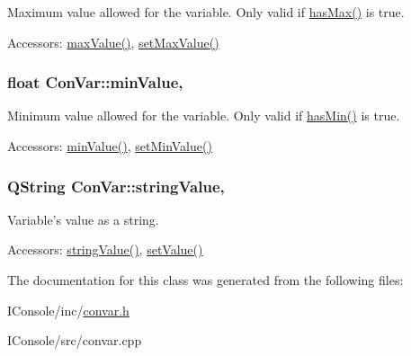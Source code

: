 Maximum value allowed for the variable. Only valid if \hyperlink{class_con_var_ab8a0883ab2a53b5ef20ea5673636ac01}{has\-Max()} is true. 

\begin{DoxyParagraph}{Accessors\-:}
\hyperlink{class_con_var_a1c7d02c351c6fe7e9eae58fa65ef0ae4}{max\-Value()}, \hyperlink{class_con_var_accd05b21f91b58de63554935dd51df7a}{set\-Max\-Value()} 
\end{DoxyParagraph}
\hypertarget{class_con_var_a6c1a10a39a46f2dcb03a0a2c8d840e7a}{
\subsubsection[{min\-Value}]{\setlength{\rightskip}{0pt plus 5cm}float Con\-Var\-::min\-Value\hspace{0.3cm}{\ttfamily [read]}, {\ttfamily [write]}}}\label{class_con_var_a6c1a10a39a46f2dcb03a0a2c8d840e7a}


Minimum value allowed for the variable. Only valid if \hyperlink{class_con_var_a047d4105baf54cb783602456e0947196}{has\-Min()} is true. 

\begin{DoxyParagraph}{Accessors\-:}
\hyperlink{class_con_var_a6c1a10a39a46f2dcb03a0a2c8d840e7a}{min\-Value()}, \hyperlink{class_con_var_a9379b560e93785245e941f35df3c56e5}{set\-Min\-Value()} 
\end{DoxyParagraph}
\hypertarget{class_con_var_aa4e598b04548ba7f296a2fbe77e13e4d}{
\subsubsection[{string\-Value}]{\setlength{\rightskip}{0pt plus 5cm}Q\-String Con\-Var\-::string\-Value\hspace{0.3cm}{\ttfamily [read]}, {\ttfamily [write]}}}\label{class_con_var_aa4e598b04548ba7f296a2fbe77e13e4d}


Variable's value as a string. 

\begin{DoxyParagraph}{Accessors\-:}
\hyperlink{class_con_var_aa4e598b04548ba7f296a2fbe77e13e4d}{string\-Value()}, \hyperlink{class_con_var_a855c6e0548e43aaa8876e90581a5e5f3}{set\-Value()} 
\end{DoxyParagraph}


The documentation for this class was generated from the following files\-:\begin{DoxyCompactItemize}
\item 
I\-Console/inc/\hyperlink{convar_8h}{convar.\-h}\item 
I\-Console/src/convar.\-cpp\end{DoxyCompactItemize}
